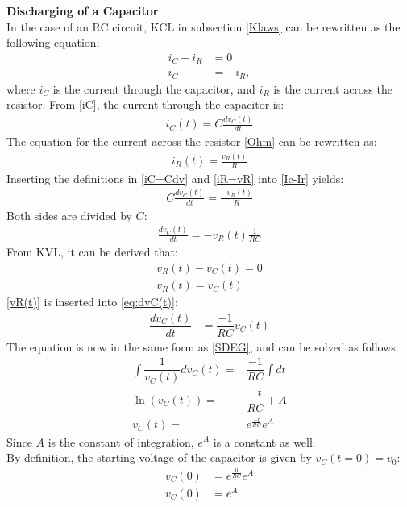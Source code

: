 \textbf{Discharging of a Capacitor}\\
In the case of an RC circuit, KCL in subsection \ref{Klaws} can be rewritten as the following equation:
\begin{align}
i_{C}+i_{R}&=0 \nonumber \\
i_{C}&= -i_{R}, \label{Ic-Ir}
\end{align}
where $i_C$ is the current through the capacitor, and $i_R$ is the current across the resistor. From \eqref{iC}, the current through the capacitor is:
\begin{align}
	i_C(t) = C\frac{dv_C(t)}{dt}\label{iC=Cdv}
\end{align}
The equation for the current across the resistor \eqref{Ohm} can be rewritten as:
\begin{align}
	i_R(t) = \frac{v_R(t)}{R}\label{iR=vR}
\end{align}
Inserting the definitions in \eqref{iC=Cdv} and \eqref{iR=vR} into \eqref{Ic-Ir} yields:
\begin{align*}
	C\frac{dv_C(t)}{dt} = \frac{-v_R(t)}{R}
\end{align*}
Both sides are divided by $C$:
\begin{align}
	\frac{dv_C(t)}{dt} =-v_R(t) \frac{1}{RC}
	\label{eq:dvC(t)}
\end{align}
From KVL, it can be derived that:
\begin{align}
	v_R(t) - v_C(t) = 0\nonumber\\
	v_R(t) = v_C(t) \label{vR(t)}
\end{align}
\eqref{vR(t)} is inserted into \eqref{eq:dvC(t)}:
\begin{align*}
	\dfrac{dv_C(t)}{dt} &= \dfrac{-1}{RC}v_C(t)
\end{align*}
The equation is now in the same form as \eqref{SDEG}, and can be solved as follows:
\begin{align}
\int \dfrac{1}{v_C(t)}dv_C(t) =& \dfrac{-1}{RC} \int dt\nonumber \\
\ln(v_C(t)) =& \dfrac{-t}{RC} + A \nonumber\\
v_C(t) =& e^{\frac{-t}{RC}}e^{A}\label{V_eA}
\end{align}
Since $A$ is the constant of integration, $e^A$ is a constant as well.
\\
By definition, the starting voltage of the capacitor is given by $v_C(t=0)=v_0$:
 \begin{align*}
	v_C(0) &= e^{\frac{0}{RC}}e^A\\
	v_C(0) &= e^A
 \end{align*}
